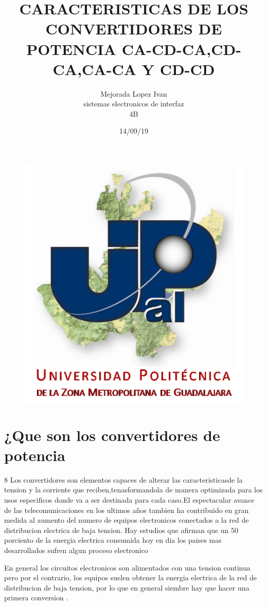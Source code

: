 \documentclass[11pt]{article}
\title{\textbf{CARACTERISTICAS DE LOS CONVERTIDORES DE POTENCIA CA-CD-CA,CD-CA,CA-CA Y CD-CD}}
\author{Mejorada Lopez Ivan\\
		sistemas electronicos de interfaz\\
	    4B	}
\date{14/09/19}
\begin{document}
\maketitle
\begin{figure}[htp]
\centering
\includegraphics[scale=1.00]{UPZMG_Prueba_1b.png}
\caption{}
\label{}
\end{figure}




\section{¿Que son los convertidores de potencia}
8
Los convertidores son elementos capaces de alterar las caracteristicasde la tension y la corriente que reciben,tenasformandola de manera optimizada para los usos especificos donde va a ser destinada para cada caso.El espectacular avance de las telecomunicaciones en los ultimos años tambien ha contribuido en gran medida al aumento del numero de equipos electronicos conectados a la red de distribucion electrica de baja tension. Hay estudios que afirman que un 50 porciento de la energia electrica consumida hoy en dia los paises mas desarrollados sufren algun proceso electronico 


En general los circuitos electronicos son alimentados con una tension continua pero por el contrario, los equipos suelen obtener la energia electrica de la red de distribucion de baja tension, por lo que en general siembre hay que hacer una primera conversion .
\end{document}

